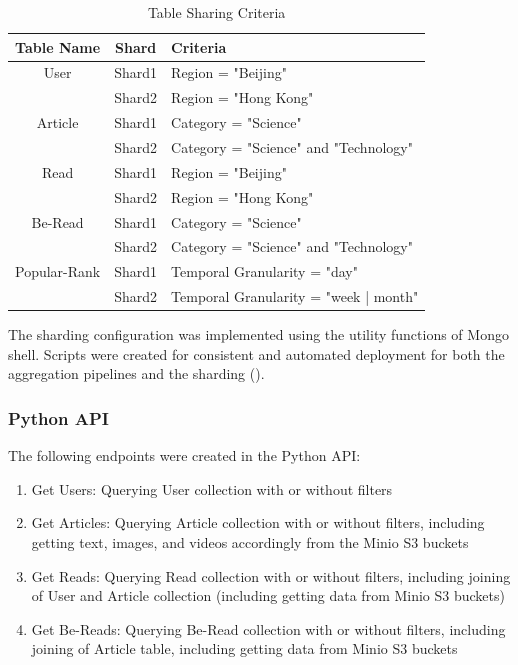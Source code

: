 \documentclass{report}
\begin{document}
    \begin{table}[H]
        \centering
        \begin{tabularx}{\textwidth}{|c|c|X|}
            \hline
            \textbf{Table Name} & \textbf{Shard} & \textbf{Criteria} \\
            \hline
            User & Shard1 & Region = "Beijing" \\
            & Shard2 & Region = "Hong Kong" \\
            \hline
            Article & Shard1 & Category = "Science" \\
            & Shard2 & Category = "Science" and "Technology" \\
            \hline
            Read & Shard1 & Region = "Beijing" \\
            & Shard2 & Region = "Hong Kong" \\
            \hline
            Be-Read & Shard1 & Category = "Science" \\
            & Shard2 & Category = "Science" and "Technology" \\
            \hline
            Popular-Rank & Shard1 & Temporal Granularity = "day" \\
            & Shard2 & Temporal Granularity = "week | month" \\
            \hline
        \end{tabularx}
        \caption{Table Sharing Criteria}
        \label{tab:table-sharing}
    \end{table}

    The sharding configuration was implemented using the utility functions of Mongo shell. Scripts were created for consistent and automated deployment for both the aggregation pipelines and the sharding ().

    \subsubsection{Python API}
    The following endpoints were created in the Python API:
    \begin{enumerate}
        \item Get Users: Querying User collection with or without filters
        \item Get Articles: Querying Article collection with or without filters, including getting text, images, and videos accordingly from the Minio S3 buckets
        \item Get Reads: Querying Read collection with or without filters, including joining of User and Article collection (including getting data from Minio S3 buckets)
        \item Get Be-Reads: Querying Be-Read collection with or without filters, including joining of Article table, including getting data from Minio S3 buckets
    \end{enumerate}
\end{document}
